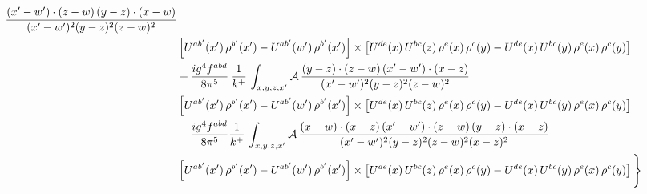 \documentclass[9pt]{article}
\numberwithin{equation}{section}
\begin{document}
\begin{align}
\frac{(x'-w')\cdot(z-w)\,(y-z)\cdot(x-w)}{(x'-w')^{2}(y-z)^{2}(z-w)^{2}}\notag \\
& \left[U^{ab'}(x')\,\rho^{b'}(x')-U^{ab'}(w')\, \rho^{b'}(x')\right]\times \left[U^{de}(x)\,U^{bc}(z)\, \rho^{e}(x)\,\rho^{c}(y)-U^{de}(x)\,U^{bc}(y)\,\rho^{e}(x)\,\rho^{c}(y)\right]\notag \\ & +\frac{ig^{4}f^{abd}}{8\pi^{5}}\,\frac{1}{k^{+}}\,\int_{x,y,z,x'}\mathcal{A}\,
\frac{(y-z)\cdot(z-w)\,(x'-w')\cdot(x-z)}{(x'-w')^{2}(y-z)^{2}(z-w)^{2}}\notag \\ & \left[U^{ab'}(x')\,\rho^{b'}(x')-U^{ab'}(w')\, \rho^{b'}(x')\right]\times \left[U^{de}(x)\,U^{bc}(z)\, \rho^{e}(x)\,\rho^{c}(y)-U^{de}(x)\,U^{bc}(y)\,\rho^{e}(x)\,\rho^{c}(y)\right]\notag \\ & -\frac{ig^{4}f^{abd}}{8\pi^{5}}\frac{1}{k^{+}}\,\int_{x,y,z,x'}\mathcal{A}\,
\frac{(x-w)\cdot(x-z)\,(x'-w')\cdot(z-w)\,(y-z)\cdot(x-z)}{(x'-w')^{2}(y-z)^{2}(z-w)^{2}(x-z)^{2}}\notag \\ & \left[U^{ab'}(x')\,\rho^{b'}(x')-U^{ab'}(w')\, \rho^{b'}(x')\right]\times \left[U^{de}(x)\,U^{bc}(z)\, \rho^{e}(x)\,\rho^{c}(y)-U^{de}(x)\,U^{bc}(y)\,\rho^{e}(x)\,\rho^{c}(y)\right]\Bigg\}
\end{align}
\end{document}
